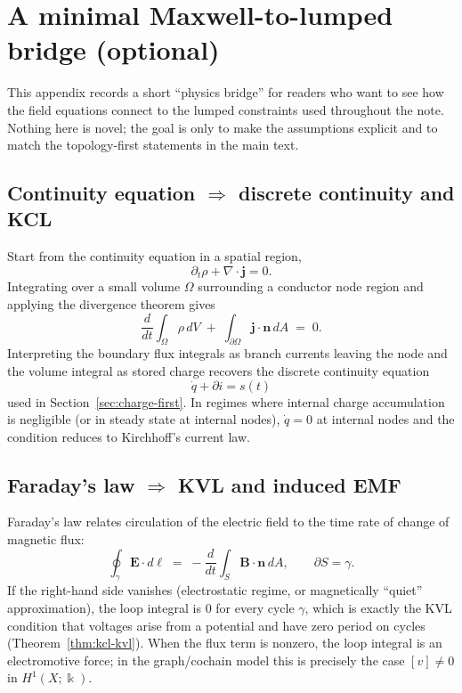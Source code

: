 \documentclass[11pt]{article}
\begin{document}
\appendix

\section{A minimal Maxwell-to-lumped bridge (optional)}
\label{app:maxwell-to-lumped}
This appendix records a short ``physics bridge'' for readers who want to see how the field equations connect to the lumped constraints used throughout the note.
Nothing here is novel; the goal is only to make the assumptions explicit and to match the topology-first statements in the main text.

\subsection{Continuity equation \texorpdfstring{$\Rightarrow$}{=>} discrete continuity and KCL}
Start from the continuity equation in a spatial region,
\[
\partial_t\rho + \nabla\cdot \mathbf{j}=0.
\]
Integrating over a small volume $\Omega$ surrounding a conductor node region and applying the divergence theorem gives
\[
\frac{d}{dt}\int_{\Omega}\rho\,dV \;+\; \int_{\partial\Omega}\mathbf{j}\cdot \mathbf{n}\,dA \;=\;0.
\]
Interpreting the boundary flux integrals as branch currents leaving the node and the volume integral as stored charge recovers the discrete continuity equation
\[
\dot q + \partial i = s(t)
\]
used in Section~\ref{sec:charge-first}.
In regimes where internal charge accumulation is negligible (or in steady state at internal nodes), $\dot q=0$ at internal nodes and the condition reduces to Kirchhoff's current law.

\subsection{Faraday's law \texorpdfstring{$\Rightarrow$}{=>} KVL and induced EMF}
Faraday's law relates circulation of the electric field to the time rate of change of magnetic flux:
\[
\oint_{\gamma} \mathbf{E}\cdot d\boldsymbol{\ell}
\;=\;
-\frac{d}{dt}\int_{S} \mathbf{B}\cdot \mathbf{n}\,dA,
\qquad \partial S=\gamma.
\]
If the right-hand side vanishes (electrostatic regime, or magnetically ``quiet'' approximation), the loop integral is $0$ for every cycle $\gamma$, which is exactly the KVL condition that voltages arise from a potential and have zero period on cycles (Theorem~\ref{thm:kcl-kvl}).
When the flux term is nonzero, the loop integral is an electromotive force; in the graph/cochain model this is precisely the case $[v]\neq 0$ in $H^1(X;\Bbbk)$.
\end{document}
